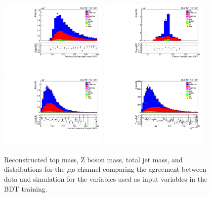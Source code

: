 \begin{figure}[htb]
\centering
\includegraphics[width=0.47\textwidth]{figs/background-estimation/plots/unblinded/prompt_mumu_ttbarInc/topMass_NPL_mumu_wMass_mumu.pdf}
\includegraphics[width=0.47\textwidth]{figs/background-estimation/plots/unblinded/prompt_mumu_ttbarInc/zPairMass_NPL_mumu_wMass_mumu.pdf}
\\
\includegraphics[width=0.47\textwidth]{figs/background-estimation/plots/unblinded/prompt_mumu_ttbarInc/totalJetMass_NPL_mumu_wMass_mumu.pdf}
\includegraphics[width=0.47\textwidth]{figs/background-estimation/plots/unblinded/prompt_mumu_ttbarInc/met_NPL_mumu_wMass_mumu.pdf}
\caption{
Reconstructed top mass, Z boson mass, total jet mass, and \MET distributions for the $\mu\mu$ channel comparing the agreement between data and simulation for the variables used as input variables in the BDT training.}
\label{fig:appInputFeaturesDataSimAgreement10}
\end{figure}

